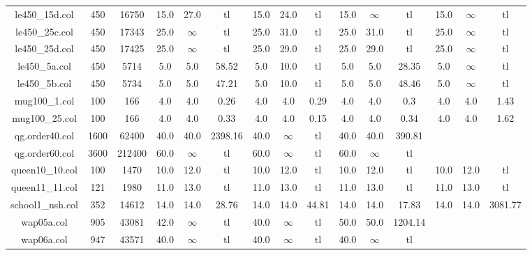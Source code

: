 \begin{tabular}{|c|c c|c c c|c c c|c c c|c c c|}
le450\_15d.col&450&16750&15.0&27.0&tl&15.0&24.0&tl&15.0&$\infty$&tl&15.0&$\infty$&tl\\
le450\_25c.col&450&17343&25.0&$\infty$&tl&25.0&31.0&tl&25.0&31.0&tl&25.0&$\infty$&tl\\
le450\_25d.col&450&17425&25.0&$\infty$&tl&25.0&29.0&tl&25.0&29.0&tl&25.0&$\infty$&tl\\
le450\_5a.col&450&5714&5.0&5.0&58.52&5.0&10.0&tl&5.0&5.0&28.35&5.0&$\infty$&tl\\
le450\_5b.col&450&5734&5.0&5.0&47.21&5.0&10.0&tl&5.0&5.0&48.46&5.0&$\infty$&tl\\
mug100\_1.col&100&166&4.0&4.0&0.26&4.0&4.0&0.29&4.0&4.0&0.3&4.0&4.0&1.43\\
mug100\_25.col&100&166&4.0&4.0&0.33&4.0&4.0&0.15&4.0&4.0&0.34&4.0&4.0&1.62\\
qg.order40.col&1600&62400&40.0&40.0&2398.16&40.0&$\infty$&tl&40.0&40.0&390.81\\
qg.order60.col&3600&212400&60.0&$\infty$&tl&60.0&$\infty$&tl&60.0&$\infty$&tl\\
queen10\_10.col&100&1470&10.0&12.0&tl&10.0&12.0&tl&10.0&12.0&tl&10.0&12.0&tl\\
queen11\_11.col&121&1980&11.0&13.0&tl&11.0&13.0&tl&11.0&13.0&tl&11.0&13.0&tl\\
school1\_nsh.col&352&14612&14.0&14.0&28.76&14.0&14.0&44.81&14.0&14.0&17.83&14.0&14.0&3081.77\\
wap05a.col&905&43081&42.0&$\infty$&tl&40.0&$\infty$&tl&50.0&50.0&1204.14\\
wap06a.col&947&43571&40.0&$\infty$&tl&40.0&$\infty$&tl&40.0&$\infty$&tl\\
\end{tabular}
